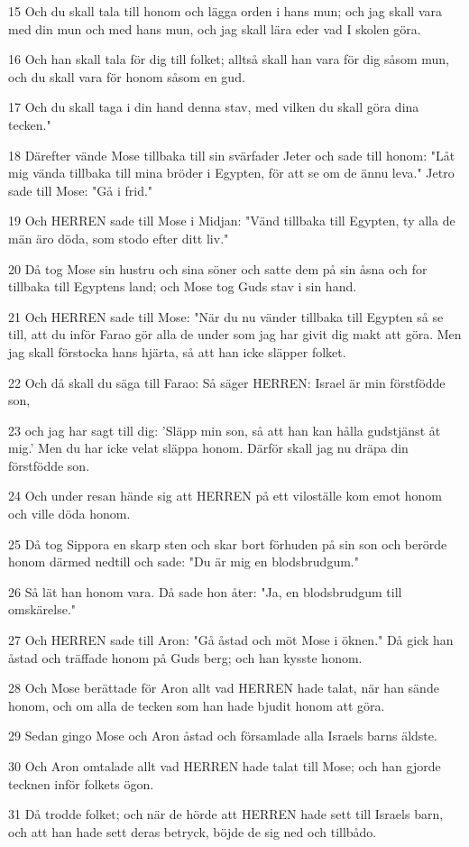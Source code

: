 \par 15 Och du skall tala till honom och lägga orden i hans mun; och jag skall vara med din mun och med hans mun, och jag skall lära eder vad I skolen göra.
\par 16 Och han skall tala för dig till folket; alltså skall han vara för dig såsom mun, och du skall vara för honom såsom en gud.
\par 17 Och du skall taga i din hand denna stav, med vilken du skall göra dina tecken."
\par 18 Därefter vände Mose tillbaka till sin svärfader Jeter och sade till honom: "Låt mig vända tillbaka till mina bröder i Egypten, för att se om de ännu leva." Jetro sade till Mose: "Gå i frid."
\par 19 Och HERREN sade till Mose i Midjan: "Vänd tillbaka till Egypten, ty alla de män äro döda, som stodo efter ditt liv."
\par 20 Då tog Mose sin hustru och sina söner och satte dem på sin åsna och for tillbaka till Egyptens land; och Mose tog Guds stav i sin hand.
\par 21 Och HERREN sade till Mose: "När du nu vänder tillbaka till Egypten så se till, att du inför Farao gör alla de under som jag har givit dig makt att göra. Men jag skall förstocka hans hjärta, så att han icke släpper folket.
\par 22 Och då skall du säga till Farao: Så säger HERREN: Israel är min förstfödde son,
\par 23 och jag har sagt till dig: 'Släpp min son, så att han kan hålla gudstjänst åt mig.' Men du har icke velat släppa honom. Därför skall jag nu dräpa din förstfödde son.
\par 24 Och under resan hände sig att HERREN på ett viloställe kom emot honom och ville döda honom.
\par 25 Då tog Sippora en skarp sten och skar bort förhuden på sin son och berörde honom därmed nedtill och sade: "Du är mig en blodsbrudgum."
\par 26 Så lät han honom vara. Då sade hon åter: "Ja, en blodsbrudgum till omskärelse."
\par 27 Och HERREN sade till Aron: "Gå åstad och möt Mose i öknen." Då gick han åstad och träffade honom på Guds berg; och han kysste honom.
\par 28 Och Mose berättade för Aron allt vad HERREN hade talat, när han sände honom, och om alla de tecken som han hade bjudit honom att göra.
\par 29 Sedan gingo Mose och Aron åstad och församlade alla Israels barns äldste.
\par 30 Och Aron omtalade allt vad HERREN hade talat till Mose; och han gjorde tecknen inför folkets ögon.
\par 31 Då trodde folket; och när de hörde att HERREN hade sett till Israels barn, och att han hade sett deras betryck, böjde de sig ned och tillbådo.

